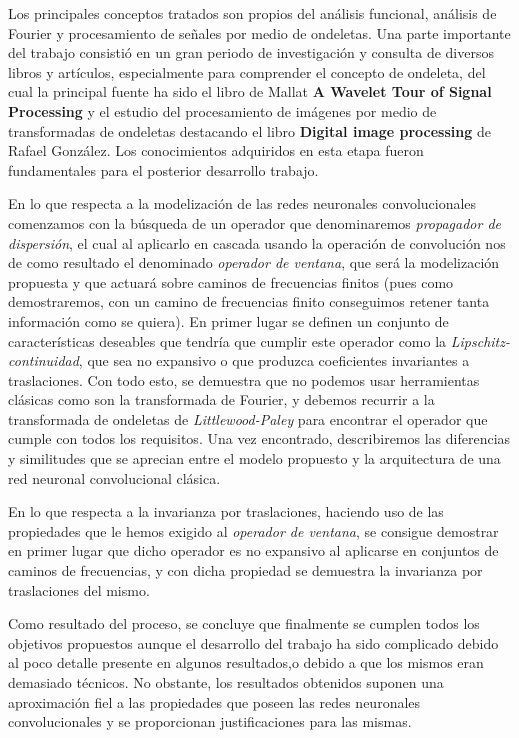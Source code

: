 \medskip
\noindent Los principales conceptos tratados son propios del análisis funcional, análisis de Fourier y procesamiento de señales por medio de ondeletas. Una parte importante del trabajo consistió en un gran periodo de investigación y consulta de diversos libros y artículos, especialmente para comprender el concepto de ondeleta, del cual la principal fuente ha sido el libro de Mallat \textbf{A Wavelet Tour of Signal Processing} y el estudio del procesamiento de imágenes por medio de transformadas de ondeletas destacando el libro \textbf{Digital image processing} de Rafael González. Los conocimientos adquiridos en esta etapa fueron fundamentales para el posterior desarrollo trabajo.


\medskip

\noindent En lo que respecta a la modelización de las redes neuronales convolucionales comenzamos con la búsqueda de un operador que denominaremos \textit{propagador de dispersión}, el cual al aplicarlo en cascada usando la operación de convolución nos de como resultado el denominado \textit{operador de ventana}, que será la modelización propuesta y que actuará sobre caminos de frecuencias finitos (pues como demostraremos, con un camino de frecuencias finito conseguimos retener tanta información como se quiera). En primer lugar se definen un conjunto de características deseables que tendría que cumplir este operador como la \textit{Lipschitz-continuidad}, que sea no expansivo o que produzca coeficientes invariantes a traslaciones. Con todo esto, se demuestra que no podemos usar herramientas clásicas como son la transformada de Fourier, y debemos recurrir a la transformada de ondeletas de \textit{Littlewood-Paley} para encontrar el operador que cumple con todos los requisitos. Una vez encontrado, describiremos las diferencias y similitudes que se aprecian entre el modelo propuesto y la arquitectura de una red neuronal convolucional clásica. 

\medskip

\noindent En lo que respecta a la invarianza por traslaciones, haciendo uso de las propiedades que le hemos exigido al \textit{operador de ventana}, se consigue demostrar en primer lugar que dicho operador es no expansivo al aplicarse en conjuntos de caminos de frecuencias, y con dicha propiedad se demuestra la invarianza por traslaciones del mismo.

\medskip
\noindent Como resultado del proceso, se concluye que finalmente se cumplen todos los objetivos propuestos aunque el desarrollo del trabajo ha sido complicado debido al poco detalle presente en algunos resultados,o debido a que los mismos eran demasiado técnicos. No obstante, los resultados obtenidos suponen una aproximación fiel a las propiedades que poseen las redes neuronales convolucionales y se proporcionan justificaciones para las mismas.

